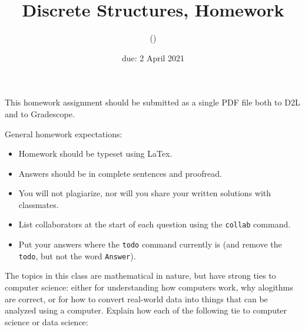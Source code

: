\documentclass{article}
\title{Discrete Structures, Homework \hwnum}
\author{\todo{Your Name Here} (\todo{your discord handle here})}
\date{due: 2 April 2021}
\begin{document}
\maketitle

This homework assignment should be
submitted as a single PDF file both to D2L and to Gradescope.

General homework expectations:
\begin{itemize}
    \item Homework should be typeset using LaTex.
    \item Answers should be in complete sentences and proofread.
    \item You will not plagiarize, nor will you share your written solutions
        with classmates.
    \item List collaborators at the start of each question using the \texttt{collab} command.
    \item Put your answers where the \texttt{todo} command currently is (and
        remove the \texttt{todo}, but not the word \texttt{Answer}).
\end{itemize}


\collab{\todo{}} 

The topics in this class are mathematical in nature, but have strong ties to
computer science: either for understanding how computers work, why alogithms are
correct, or for how to convert real-world data into things that can be analyzed
using a computer.  Explain how each of the following tie to computer science or
data science:
\end{document}
